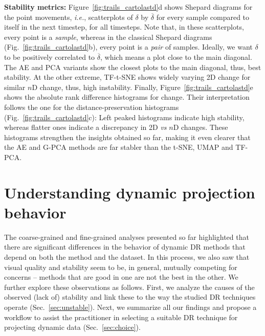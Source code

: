 \noindent\textbf{Stability metrics:} Figure~\ref{fig:trails_cartolastd}d shows Shepard diagrams for the point movements, \emph{i.e.}, scatterplots of $\delta$ by $\overline{\delta}$ for every sample compared to itself in the next timestep, for all timesteps. Note that, in these scatterplots, every point is a \emph{sample}, whereas in the classical Shepard diagrams (Fig.~\ref{fig:trails_cartolastd}b), every point is a \emph{pair} of samples. Ideally, we want $\delta$ to be positively correlated to $\overline{\delta}$, which means a plot close to the main diagonal.
The AE and PCA variants show the closest plots to the main diagonal, thus, best stability. At the other extreme, TF-t-SNE shows widely varying 2D change for similar $n$D change, thus, high instability. Finally, Figure~\ref{fig:trails_cartolastd}e shows the absolute rank difference histograms for change. Their interpretation follows the one for the distance-preservation histograms (Fig.~\ref{fig:trails_cartolastd}c):
Left peaked histograms indicate high stability, whereas flatter ones indicate a discrepancy in 2D \emph{vs} $n$D changes. These histograms strengthen the insights obtained so far, making it even clearer that the AE and G-PCA methods are far stabler than the t-SNE, UMAP and TF-PCA.




\vspace{-0.15cm}
\section{Understanding dynamic projection behavior}
\label{sec:discussion}
%
The coarse-grained and fine-grained analyses presented so far highlighted that there are significant differences in the behavior of dynamic DR methods that depend on both the method and the dataset.
In this process, we also saw that visual quality and stability seem to be, in general, mutually competing for concerns -- methods that are good in one are not the best in the other.
We further explore these observations as follows. First, we analyze the causes of the observed (lack of) stability and link these to the way the studied DR techniques operate (Sec.~\ref{sec:unstable}). Next,
we summarize all our findings and propose a workflow to assist the practitioner in selecting a suitable DR technique for projecting dynamic data (Sec.~\ref{sec:choice}).

